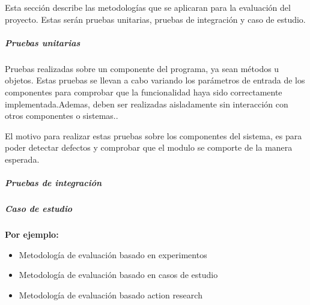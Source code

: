 \documentclass[11pt,letterpaper]{article}
\begin{document}
Esta sección describe las metodologías que se aplicaran para la evaluación del proyecto. Estas serán pruebas unitarias, pruebas de integración y caso de estudio.

\subsubsection{Pruebas unitarias}
Pruebas realizadas sobre un componente del programa, ya sean métodos u objetos. Estas pruebas se llevan a cabo variando los parámetros de entrada de los componentes para comprobar que la funcionalidad haya sido correctamente implementada.Ademas, deben ser realizadas aisladamente sin interacción con otros componentes o sistemas.\cite{Sommerville2010}.

El motivo para realizar estas pruebas sobre los componentes del sistema, es para poder detectar defectos y comprobar que el modulo se comporte de la manera esperada.

\subsubsection{Pruebas de integración}

\subsubsection{Caso de estudio}

\textbf{Por ejemplo:}
\begin{itemize}
	\item Metodología de evaluación basado en experimentos
	\item Metodología de evaluación basado en casos de estudio
	\item Metodología de evaluación basado action research
\end{itemize}

\part{%
%
}
\end{document}
